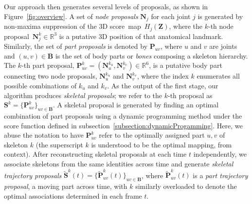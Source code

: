 Our approach then generates several levels of proposals, as shown in Figure~\ref{fig:overview}. A set of \textit{node proposals} $\mathbf{N}_j$ for each joint $j$ is generated by non-maxima suppression of the 3D score~map~$H_j(\mathbf{Z})$, where the $k$-th node proposal~$\mathbf{N}_j^k \in \mathds{R}^{3}$ is a putative 3D position of that anatomical landmark. Similarly, the set of \textit{part proposals} is denoted by $\mathbf{P}_{uv}$, where $u$ and $v$ are joints and $(u,v) \in \mathbf{B}$ is the set of body parts or {\em bones} composing a skeleton hierarchy.
The $k$-th part proposal, $\mathbf{P}_{uv}^k= (\mathbf{N}_u^{k_u}, \mathbf{N}_v^{k_v}) \in \mathds{R}^6$, is a putative body part connecting two node proposals, $\mathbf{N}_u^{k_u}$ and $\mathbf{N}_v^{k_v}$, where the index $k$ enumerates all possible combinations of $k_u$ and $k_v$. As the output of the first stage, our algorithm produces \textit{skeletal proposals}; we refer to the $k$-th proposal as $\mathbf{S}^k = \{\mathbf{P}_{uv}^{k}\}_{uv \in \mathbf{B}}$. A skeletal proposal is generated by finding an optimal combination of part proposals using a dynamic programming method under the score function defined in subsection~\ref{subsection:dynamicProgamming}. Here, we abuse the notation to have $\mathbf{P}_{uv}^{k}$ refer to the optimally assigned part $u,v$ of skeleton $k$ (the superscript $k$ is understood to be the optimal mapping, from context). After reconstructing skeletal proposals at each time $t$ independently, we associate skeletons from the same identities across time and generate \textit{skeletal trajectory proposals} $\mathbf{\tilde{S}}^k(t) = \{\mathbf{\tilde{P}}^k_{uv}(t)\}_{uv \in \mathbf{B}}$, where $\mathbf{\tilde{P}}^k_{uv}(t)$ is a \textit{part trajectory proposal}, a moving part across time, with $k$ similarly overloaded to denote the optimal associations determined in each frame $t$.


